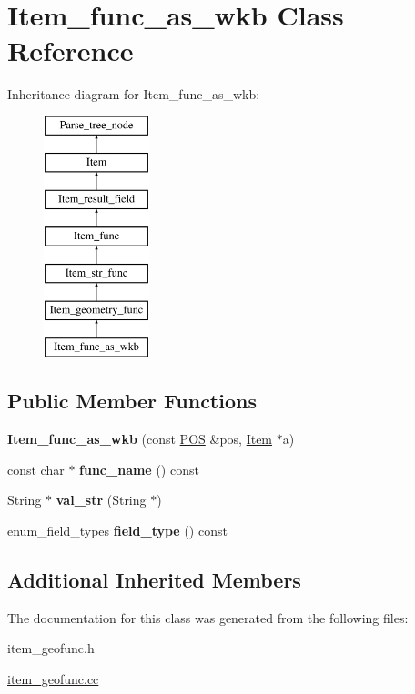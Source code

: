 \hypertarget{classItem__func__as__wkb}{}\section{Item\+\_\+func\+\_\+as\+\_\+wkb Class Reference}
\label{classItem__func__as__wkb}
Inheritance diagram for Item\+\_\+func\+\_\+as\+\_\+wkb\+:\begin{figure}[H]
\begin{center}
\leavevmode
\includegraphics[height=7.000000cm]{classItem__func__as__wkb}
\end{center}
\end{figure}
\subsection*{Public Member Functions}
\begin{DoxyCompactItemize}
\item 
\mbox{\label{classItem__func__as__wkb_a5176b99b34e2a3fbb2fcedd5bca250fa}} 
{\bfseries Item\+\_\+func\+\_\+as\+\_\+wkb} (const \mbox{\hyperlink{structYYLTYPE}{P\+OS}} \&pos, \mbox{\hyperlink{classItem}{Item}} $\ast$a)
\item 
\mbox{\label{classItem__func__as__wkb_a0fbe85208dd9bbc8ce6dcf87f65195fd}} 
const char $\ast$ {\bfseries func\+\_\+name} () const
\item 
\mbox{\label{classItem__func__as__wkb_aac0d750ca3d335749cbb9672c92851d7}} 
String $\ast$ {\bfseries val\+\_\+str} (String $\ast$)
\item 
\mbox{\label{classItem__func__as__wkb_ae953e08a0b51b40ac20dccd7d21c24e0}} 
enum\+\_\+field\+\_\+types {\bfseries field\+\_\+type} () const
\end{DoxyCompactItemize}
\subsection*{Additional Inherited Members}


The documentation for this class was generated from the following files\+:\begin{DoxyCompactItemize}
\item 
item\+\_\+geofunc.\+h\item 
\mbox{\hyperlink{item__geofunc_8cc}{item\+\_\+geofunc.\+cc}}\end{DoxyCompactItemize}
